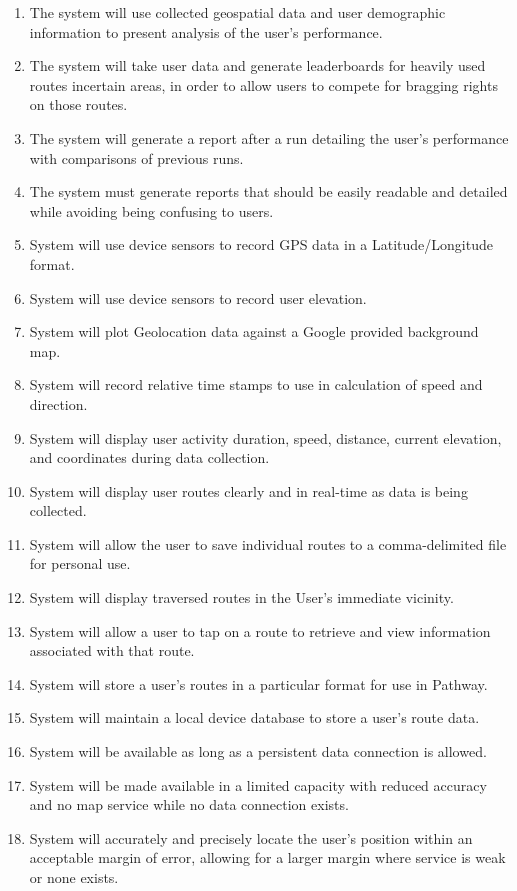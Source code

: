 \documentclass{article}
\begin{document}
\begin{enumerate}
    \item The system will use collected geospatial data and user demographic information to present analysis of the user’s performance.
    \item The system will take user data and generate leaderboards for heavily used routes incertain areas, in order to allow users to compete for bragging rights on those routes.
    \item The system will generate a report after a run detailing the user’s performance with comparisons of previous runs.
    \item The system must generate reports that should be easily readable and detailed while avoiding being confusing to users.
    \item System will use device sensors to record GPS data in a Latitude/Longitude format.
    \item System will use device sensors to record user elevation.
    \item System will plot Geolocation data against a Google provided background map.
    \item System will record relative time stamps to use in calculation of speed and direction.
    \item System will display user activity duration, speed, distance, current elevation, and coordinates during data collection.
    \item System will display user routes clearly and in real-time as data is being collected.
    \item System will allow the user to save individual routes to a comma-delimited file for personal use.
    \item System will display traversed routes in the User's immediate vicinity.
    \item System will allow a user to tap on a route to retrieve and view information associated with that route.
    \item System will store a user’s routes in a particular format for use in Pathway.
    \item System will maintain a local device database to store a user's route data.
    \item System will be available as long as a persistent data connection is allowed.
    \item System will be made available in a limited capacity with reduced accuracy and no map service while no data connection exists.
    \item System will accurately and precisely locate the user’s position within an acceptable margin of error, allowing for a larger margin where service is weak or none exists.

\end{enumerate}
\end{document}
